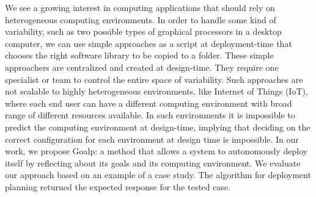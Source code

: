 We see a growing interest in computing applications that should rely on heterogeneous computing environments. In order to handle some kind of variability, such as two possible types of graphical processors in a desktop computer, we can use simple approaches as a script at deployment-time that chooses the right software library to be copied to a folder.
These simple approachers are centralized and created at design-time. They require one specialist or team to control the entire space of variability.
Such approaches are not scalable to highly heterogeneous environments, like Internet of Things (IoT), where each end user can have a different computing environment with broad range of different resources available.
In such environments it is impossible to predict the computing environment at design-time, implying that deciding on the correct configuration for each environment at design time is impossible.
In our work, we propose Goalp: a method that allows a system to autonomously deploy itself by reflecting about its goals and its computing environment.
We evaluate our approach based on an example of a case study. The algorithm for deployment planning returned the expected response for the tested case.

